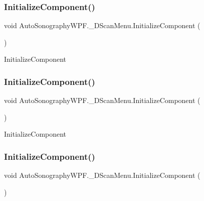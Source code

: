 \subsubsection{\texorpdfstring{Initialize\+Component()}{InitializeComponent()}\hspace{0.1cm}{\footnotesize\ttfamily [1/4]}}
{\footnotesize\ttfamily void Auto\+Sonography\+W\+P\+F.\+\_\+D\+Scan\+Menu.\+Initialize\+Component (\begin{DoxyParamCaption}{ }\end{DoxyParamCaption})}



Initialize\+Component 

\hypertarget{class_auto_sonography_w_p_f_1_1__3_d_scan_menu_a5e15f9a4094b27b93e34a8c3760db6a5}{}\label{class_auto_sonography_w_p_f_1_1__3_d_scan_menu_a5e15f9a4094b27b93e34a8c3760db6a5} 
\subsubsection{\texorpdfstring{Initialize\+Component()}{InitializeComponent()}\hspace{0.1cm}{\footnotesize\ttfamily [2/4]}}
{\footnotesize\ttfamily void Auto\+Sonography\+W\+P\+F.\+\_\+D\+Scan\+Menu.\+Initialize\+Component (\begin{DoxyParamCaption}{ }\end{DoxyParamCaption})}



Initialize\+Component 

\hypertarget{class_auto_sonography_w_p_f_1_1__3_d_scan_menu_a5e15f9a4094b27b93e34a8c3760db6a5}{}\label{class_auto_sonography_w_p_f_1_1__3_d_scan_menu_a5e15f9a4094b27b93e34a8c3760db6a5} 
\subsubsection{\texorpdfstring{Initialize\+Component()}{InitializeComponent()}\hspace{0.1cm}{\footnotesize\ttfamily [3/4]}}
{\footnotesize\ttfamily void Auto\+Sonography\+W\+P\+F.\+\_\+D\+Scan\+Menu.\+Initialize\+Component (\begin{DoxyParamCaption}{ }\end{DoxyParamCaption})}



